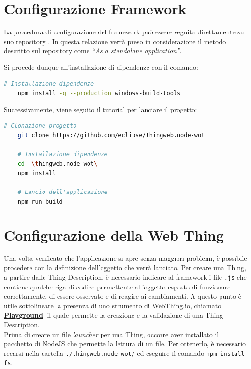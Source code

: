 \documentclass[12pt,a4paper,openright,oneside]{report}
\newcommand{\quotes}[1]{``#1''}
\begin{document}
\clearpage


\section{Configurazione Framework}
La procedura di configurazione del framework può essere seguita direttamente sul suo \href{https://github.com/eclipse/thingweb.node-wot/}{repository} \cite{thingweb}. In questa relazione verrà preso in considerazione il metodo descritto sul repository come \textit{\quotes{As a standalone application}}.

Si procede dunque all'installazione di dipendenze con il comando:
\begin{lstlisting}[language=bash]
	# Installazione dipendenze
	npm install -g --production windows-build-tools
\end{lstlisting}

Successivamente, viene seguito il tutorial per lanciare il progetto:
\begin{lstlisting}[language=bash]
	# Clonazione progetto
	git clone https://github.com/eclipse/thingweb.node-wot
	
	# Installazione dipendenze
	cd .\thingweb.node-wot\
	npm install
	
	# Lancio dell'applicazione
	npm run build
\end{lstlisting}


\section{Configurazione della Web Thing}
Una volta verificato che l'applicazione si apre senza maggiori problemi, è possibile procedere con la definizione dell'oggetto che verrà lanciato. Per creare una Thing, a partire dalle Thing Description, è necessario indicare al framework i file \texttt{.js} che contiene qualche riga di codice permettente all'oggetto esposto di funzionare correttamente, di essere osservato e di reagire ai cambiamenti. A questo punto è utile sottolineare la presenza di uno strumento di WebThing.io, chiamato \href{http://plugfest.thingweb.io/playground/}{\textbf{Playground}}, il quale permette la creazione e la validazione di una Thing Description.\\

Prima di creare un file \textit{launcher} per una Thing, occorre aver installato il pacchetto di NodeJS che permette la lettura di un file. Per ottenerlo, è necessario recarsi nella cartella \texttt{./thingweb.node-wot/} ed eseguire il comando \texttt{npm install fs}.\\
\end{document}
